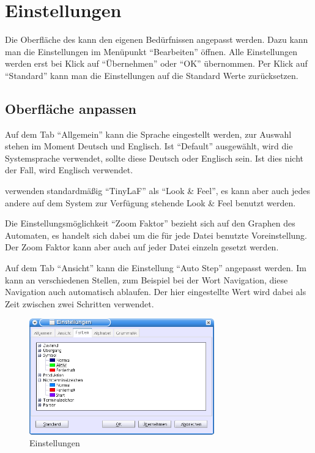 \chapter{Einstellungen}\label{Preferences}

Die Oberfläche des \gtitools kann den eigenen Bedürfnissen angepasst werden.
Dazu kann man die Einstellungen im Menüpunkt "`Bearbeiten"' öffnen. Alle
Einstellungen werden erst bei Klick auf "`Übernehmen"' oder "`OK"' übernommen.
Per Klick auf "`Standard"' kann man die Einstellungen auf die Standard Werte
zurücksetzen.


\section{Oberfläche anpassen}

Auf dem Tab "`Allgemein"' kann die Sprache eingestellt werden, zur Auswahl
stehen im Moment Deutsch und Englisch. Ist "`Default"' ausgewählt, wird
die Systemsprache verwendet, sollte diese Deutsch oder Englisch sein. Ist dies
nicht der Fall, wird Englisch verwendet.\vspace{10pt}

\gtitool verwenden standardmäßig "`TinyLaF"' als "`Look \& Feel"', es kann aber
auch jedes andere auf dem System zur Verfügung stehende Look \& Feel benutzt
werden.\vspace{10pt}

Die Ein\-stell\-ungs\-möglich\-keit "`Zoom Faktor"' bezieht sich auf den Graphen 
des Automaten, es handelt sich dabei um die für jede Datei benutzte
Voreinstellung. Der Zoom Faktor kann aber auch auf jeder Datei einzeln gesetzt
werden.\vspace{10pt}

Auf dem Tab "`Ansicht"' kann die Einstellung "`Auto Step"' angepasst werden. Im
\gtitool kann an verschiedenen Stellen, zum Beispiel bei der Wort Navigation, diese
Navigation auch automatisch ablaufen. Der hier eingestellte Wert wird dabei
als Zeit zwischen zwei Schritten verwendet.\vspace{10pt}

\begin{figure}[h]
\begin{center}
\includegraphics[width=8cm]{images/preferences.png}
\caption{Einstellungen}
\end{center}
\end{figure}

